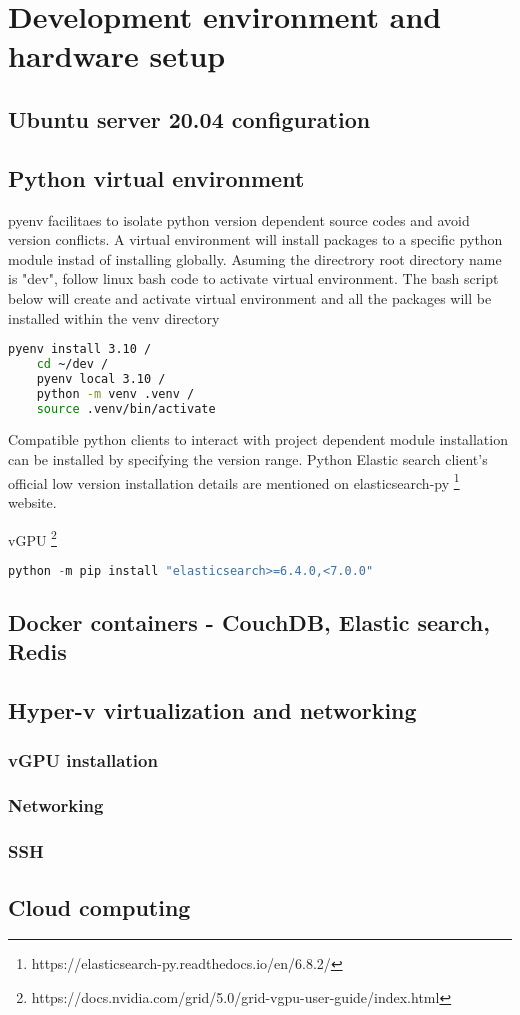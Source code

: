 \chapter{Development environment and hardware setup}

\section {Ubuntu server 20.04 configuration}

\section {Python virtual environment} \label {pyenv}

pyenv facilitaes to isolate python version dependent source codes and avoid version conflicts. A virtual environment will install packages to a specific python module instad of installing globally. Asuming the directrory root directory name is "dev", follow linux bash code to activate virtual environment. 
The bash script below will create and activate virtual environment and all the packages will be installed within the venv directory
\begin{lstlisting}[language=bash]
    pyenv install 3.10 /
    cd ~/dev /
    pyenv local 3.10 /
    python -m venv .venv /
    source .venv/bin/activate

\end{lstlisting}

Compatible python clients to interact with project dependent module installation can be installed by specifying the version range.
Python Elastic search client's official low version installation details are mentioned on elasticsearch-py \footnote{https://elasticsearch-py.readthedocs.io/en/6.8.2/} website.

vGPU \footnote{https://docs.nvidia.com/grid/5.0/grid-vgpu-user-guide/index.html}

\begin{lstlisting}[language=Python]
    python -m pip install "elasticsearch>=6.4.0,<7.0.0"
\end{lstlisting}

\section {Docker containers - CouchDB, Elastic search, Redis}

\section {Hyper-v virtualization and networking}

\subsection{vGPU installation}

\subsection{Networking}

\subsection{SSH}


\section{Cloud computing}